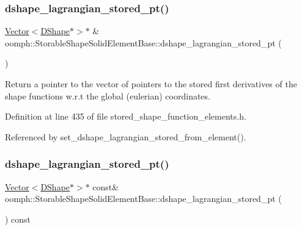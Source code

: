 \subsubsection{\texorpdfstring{dshape\+\_\+lagrangian\+\_\+stored\+\_\+pt()}{dshape\_lagrangian\_stored\_pt()}\hspace{0.1cm}{\footnotesize\ttfamily [1/2]}}
{\footnotesize\ttfamily \hyperlink{classoomph_1_1Vector}{Vector}$<$\hyperlink{classoomph_1_1DShape}{D\+Shape}$\ast$$>$$\ast$ \& oomph\+::\+Storable\+Shape\+Solid\+Element\+Base\+::dshape\+\_\+lagrangian\+\_\+stored\+\_\+pt (\begin{DoxyParamCaption}{ }\end{DoxyParamCaption})\hspace{0.3cm}{\ttfamily [inline]}}



Return a pointer to the vector of pointers to the stored first derivatives of the shape functions w.\+r.\+t the global (eulerian) coordinates. 



Definition at line 435 of file stored\+\_\+shape\+\_\+function\+\_\+elements.\+h.



Referenced by set\+\_\+dshape\+\_\+lagrangian\+\_\+stored\+\_\+from\+\_\+element().

\mbox{\label{classoomph_1_1StorableShapeSolidElementBase_ac10eb02930b7e5a08ce506eb2e2b6614}} 
\subsubsection{\texorpdfstring{dshape\+\_\+lagrangian\+\_\+stored\+\_\+pt()}{dshape\_lagrangian\_stored\_pt()}\hspace{0.1cm}{\footnotesize\ttfamily [2/2]}}
{\footnotesize\ttfamily \hyperlink{classoomph_1_1Vector}{Vector}$<$\hyperlink{classoomph_1_1DShape}{D\+Shape}$\ast$$>$$\ast$ const\& oomph\+::\+Storable\+Shape\+Solid\+Element\+Base\+::dshape\+\_\+lagrangian\+\_\+stored\+\_\+pt (\begin{DoxyParamCaption}{ }\end{DoxyParamCaption}) const\hspace{0.3cm}{\ttfamily [inline]}}



